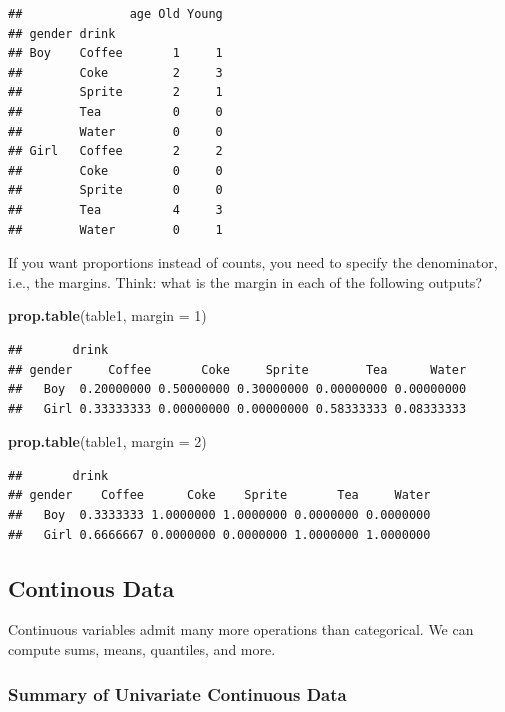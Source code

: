 \documentclass[]{book}
\newenvironment{Shaded}{\begin{snugshade}}{\end{snugshade}}
\newcommand{\KeywordTok}[1]{\textcolor[rgb]{0.13,0.29,0.53}{\textbf{#1}}}
\newcommand{\DataTypeTok}[1]{\textcolor[rgb]{0.13,0.29,0.53}{#1}}
\newcommand{\DecValTok}[1]{\textcolor[rgb]{0.00,0.00,0.81}{#1}}
\newcommand{\NormalTok}[1]{#1}
\theoremstyle{definition}
\theoremstyle{definition}
\theoremstyle{definition}
\theoremstyle{remark}
\begin{document}
\begin{verbatim}
##               age Old Young
## gender drink               
## Boy    Coffee       1     1
##        Coke         2     3
##        Sprite       2     1
##        Tea          0     0
##        Water        0     0
## Girl   Coffee       2     2
##        Coke         0     0
##        Sprite       0     0
##        Tea          4     3
##        Water        0     1
\end{verbatim}

If you want proportions instead of counts, you need to specify the
denominator, i.e., the margins. Think: what is the margin in each of the
following outputs?

\begin{Shaded}
\begin{Highlighting}[]
\KeywordTok{prop.table}\NormalTok{(table1, }\DataTypeTok{margin =} \DecValTok{1}\NormalTok{)}
\end{Highlighting}
\end{Shaded}

\begin{verbatim}
##       drink
## gender     Coffee       Coke     Sprite        Tea      Water
##   Boy  0.20000000 0.50000000 0.30000000 0.00000000 0.00000000
##   Girl 0.33333333 0.00000000 0.00000000 0.58333333 0.08333333
\end{verbatim}

\begin{Shaded}
\begin{Highlighting}[]
\KeywordTok{prop.table}\NormalTok{(table1, }\DataTypeTok{margin =} \DecValTok{2}\NormalTok{)}
\end{Highlighting}
\end{Shaded}

\begin{verbatim}
##       drink
## gender    Coffee      Coke    Sprite       Tea     Water
##   Boy  0.3333333 1.0000000 1.0000000 0.0000000 0.0000000
##   Girl 0.6666667 0.0000000 0.0000000 1.0000000 1.0000000
\end{verbatim}

\subsection{Continous Data}\label{continous-data}

Continuous variables admit many more operations than categorical. We can
compute sums, means, quantiles, and more.

\subsubsection{Summary of Univariate Continuous
Data}\label{summary-of-univariate-continuous-data}
\end{document}
